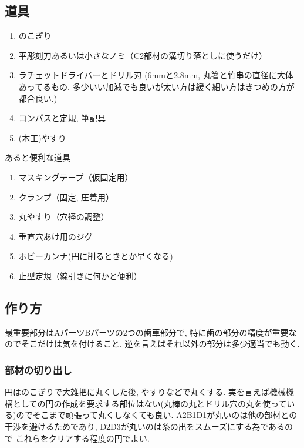 \documentclass{jarticle}
\begin{document}
\subsection{道具}
\begin{enumerate}
\item のこぎり
\item 平彫刻刀あるいは小さなノミ（C2部材の溝切り落としに使うだけ）
\item ラチェットドライバーとドリル刃
	(6mmと2.8mm, 丸箸と竹串の直径に大体あってるもの.
	多少いい加減でも良いが太い方は緩く細い方はきつめの方が都合良い.)
\item コンパスと定規, 筆記具
\item (木工)やすり
\end{enumerate}

あると便利な道具
\begin{enumerate}
\item マスキングテープ（仮固定用）
\item クランプ（固定, 圧着用）
\item 丸やすり（穴径の調整）
\item 垂直穴あけ用のジグ
\item ホビーカンナ(円に削るときとか早くなる)
\item 止型定規（線引きに何かと便利）
\end{enumerate}

\subsection{作り方}
最重要部分はAパーツBパーツの2つの歯車部分で, 特に歯の部分の精度が重要なのでそこだけは気を付けること.
逆を言えばそれ以外の部分は多少適当でも動く.

\subsubsection{部材の切り出し}


円はのこぎりで大雑把に丸くした後, やすりなどで丸くする.
実を言えば機械機構としての円の作成を要求する部位はない(丸棒の丸とドリル穴の丸を使っている)のでそこまで頑張って丸くしなくても良い.
A2B1D1が丸いのは他の部材との干渉を避けるためであり, D2D3が丸いのは糸の出をスムーズにする為であるので
これらをクリアする程度の円でよい.
\end{document}
